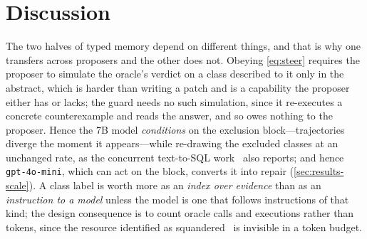 \section{Discussion}
\label{sec:discussion}

The two halves of typed memory depend on different things, and that is why one
transfers across proposers and the other does not. Obeying \cref{eq:steer}
requires the proposer to simulate the oracle's verdict on a class described to
it only in the abstract, which is harder than writing a patch and is a
capability the proposer either has or lacks; the guard needs no such
simulation, since it re-executes a concrete counterexample and reads the
answer, and so owes nothing to the proposer. Hence the 7B model
\emph{conditions} on the exclusion block---trajectories diverge the moment it
appears---while re-drawing the excluded classes at an unchanged rate, as the
concurrent text-to-SQL work~\cite{vo2026merit} also reports; and hence
\texttt{gpt-4o-mini}, which can act on the block, converts it into repair
(\cref{sec:results-scale}). A class label is worth more as an \emph{index over
evidence} than as an \emph{instruction to a model} unless the model is one that
follows instructions of that kind; the design consequence is to count oracle
calls and executions rather than tokens, since the resource identified as
squandered~\cite{lin2026run} is invisible in a token budget.
